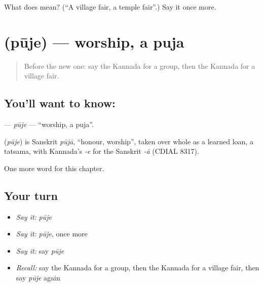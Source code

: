 \begin{tcolorbox}[breakable,colback=teal!4,colframe=teal!35!black,title={Before you move on}]
What does  mean? (\textquotedblleft{}A village fair, a temple fair\textquotedblright{}.) Say it once more.
\end{tcolorbox}
\section[\texorpdfstring{\kn{ಪೂಜೆ} (pūje)}{ಪೂಜೆ (pūje)}]{ (pūje) — worship, a puja}

\label{lesson:KA-C189-puje}



\begin{quote}
Before the new one: say the Kannada for a group, then the Kannada for a village fair.
\end{quote}

\subsection*{You'll want to know: }
\textbf{} — \emph{pūje} — \textquotedblleft{}worship, a puja\textquotedblright{}.

\begin{cousinweb}
\textbf{} (\emph{pūje}) is Sanskrit \emph{pūjā}, \textquotedblleft{}honour, worship\textquotedblright{}, taken over whole as a learned loan, a tatsama, with Kannada's \emph{-e} for the Sanskrit \emph{-ā} (CDIAL 8317).
\end{cousinweb}

\begin{grammarlens}[title={What you've built}]
One more word for this chapter.
\end{grammarlens}

\subsection*{Your turn}
\begin{itemize}
\raggedright
  \item \emph{Say it:} \emph{pūje}
  \item \emph{Say it:} \emph{pūje}, once more
  \item \emph{Say it:} say \emph{pūje}
  \item \emph{Recall:} say the Kannada for a group, then the Kannada for a village fair, then say \emph{pūje} again
\end{itemize}

